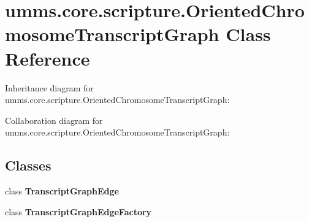 \hypertarget{classumms_1_1core_1_1scripture_1_1_oriented_chromosome_transcript_graph}{\section{umms.\+core.\+scripture.\+Oriented\+Chromosome\+Transcript\+Graph Class Reference}
\label{classumms_1_1core_1_1scripture_1_1_oriented_chromosome_transcript_graph}
}


Inheritance diagram for umms.\+core.\+scripture.\+Oriented\+Chromosome\+Transcript\+Graph\+:


Collaboration diagram for umms.\+core.\+scripture.\+Oriented\+Chromosome\+Transcript\+Graph\+:
\subsection*{Classes}
\begin{DoxyCompactItemize}
\item 
class {\bfseries Transcript\+Graph\+Edge}
\item 
class {\bfseries Transcript\+Graph\+Edge\+Factory}
\end{DoxyCompactItemize}
